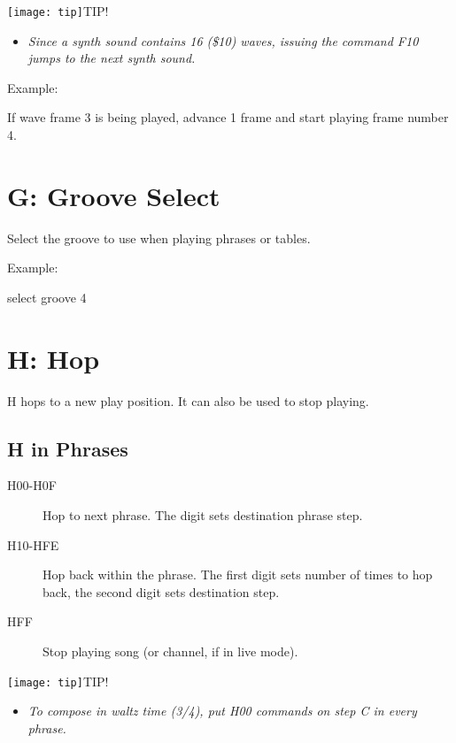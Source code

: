 \texttt{[image: tip]}TIP!
\begin{itemize}
        \item \textit{Since a synth sound contains 16 (\$10) waves, issuing the command \textsc{F10} jumps to the next synth sound.}
	\end{itemize}

\begin{description}
\item Example:
\item[F01] If wave frame 3 is being played, advance 1 frame and start playing frame number 4.
\end{description}

\section{G: Groove Select}

Select the groove to use when playing phrases or tables.

\begin{description}
\item Example:
\item[G04] select groove 4
\end{description}

\section{H: Hop}

H hops to a new play position. It can also be used to stop playing.

\subsection{H in Phrases}

\begin{description}
    \item[H00-H0F] Hop to next phrase. The digit sets destination phrase step.
    \item[H10-HFE] Hop back within the phrase. The first digit sets number of times to hop back, the second digit sets destination step.
    \item[HFF] Stop playing song (or channel, if in live mode).
\end{description}

\texttt{[image: tip]}TIP!
\nolinebreak
\begin{itemize}
        \item \textit{To compose in waltz time (3/4), put \textsc{H00} commands on step \textsc{C} in every phrase.}
\end{itemize}

